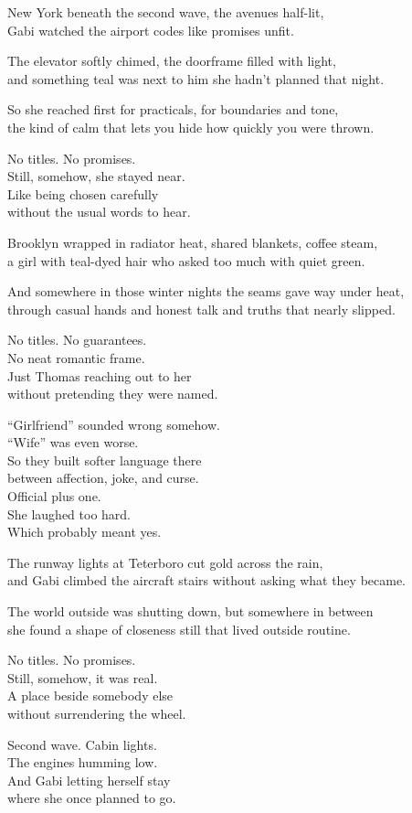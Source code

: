 \begin{lyrics}

New York beneath the second wave, the avenues half-lit,\\
Gabi watched the airport codes like promises unfit.

The elevator softly chimed, the doorframe filled with light,\\
and something teal was next to him she hadn’t planned that night.

So she reached first for practicals, for boundaries and tone,\\
the kind of calm that lets you hide how quickly you were thrown.

No titles. %
No promises.\\
Still, somehow, she stayed near.\\
Like being chosen carefully\\
without the usual words to hear.

Brooklyn wrapped in radiator heat, shared blankets, coffee steam,\\
a girl with teal-dyed hair who asked too much with quiet green.

And somewhere in those winter nights the seams gave way under heat,\\
through casual hands and honest talk and truths that nearly slipped.

No titles. %
No guarantees.\\
No neat romantic frame.\\
Just Thomas reaching out to her\\
without pretending they were named.

“Girlfriend” sounded wrong somehow.\\
“Wife” was even worse.\\
So they built softer language there\\
between affection, joke, and curse.\\
Official plus one.\\
She laughed too hard.\\
Which probably meant yes.

The runway lights at Teterboro cut gold across the rain,\\
and Gabi climbed the aircraft stairs without asking what they became.

The world outside was shutting down, but somewhere in between\\
she found a shape of closeness still that lived outside routine.

No titles. %
No promises.\\
Still, somehow, it was real.\\
A place beside somebody else\\
without surrendering the wheel.

Second wave. %
Cabin lights.\\
The engines humming low.\\
And Gabi letting herself stay\\
where she once planned to go.

\end{lyrics}

